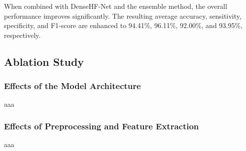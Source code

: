 When combined with DenseHF-Net and the ensemble method, the overall performance improves significantly. The resulting average accuracy, sensitivity, specificity, and F1-score are enhanced to 94.41\%, 96.11\%, 92.00\%, and 93.95\%, respectively.
\subsection{Ablation Study}
\subsubsection{Effects of the Model Architecture}
aaa
\subsubsection{Effects of Preprocessing and Feature Extraction}
aaa